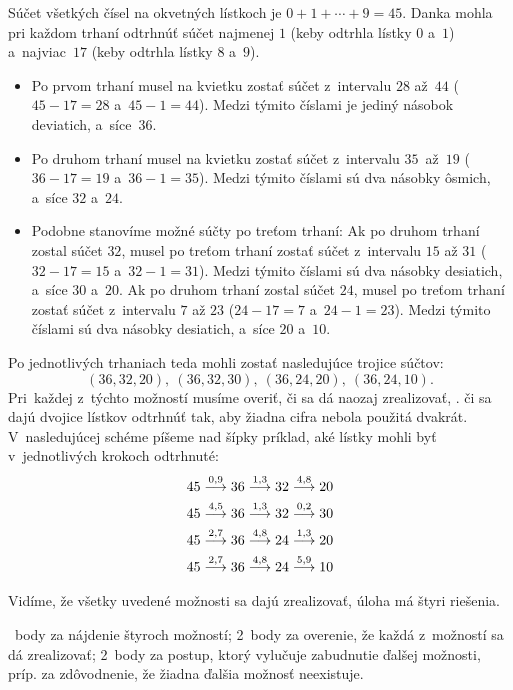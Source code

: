 {%
Súčet všetkých čísel na okvetných lístkoch je $0+1+\cdots+9=45$.
Danka mohla pri každom trhaní odtrhnúť súčet najmenej $1$ (keby odtrhla
lístky $0$ a~$1$) a~najviac~$17$ (keby odtrhla lístky $8$ a~$9$).
\begin{itemize}
\item Po prvom trhaní musel na kvietku zostať súčet z~intervalu $28$ až~$44$
($45-17=28$ a~$45-1=44$).
Medzi týmito číslami je jediný násobok deviatich, a~síce~$36$.
\item Po druhom trhaní musel na kvietku zostať súčet z~intervalu $35$~až~$19$
($36-17=19$ a~$36-1=35$). Medzi týmito číslami sú dva násobky ôsmich, a~síce
$32$ a~$24$.
\item Podobne stanovíme možné súčty po treťom trhaní:
\itemitem{--}
Ak po druhom trhaní zostal súčet $32$, musel po treťom trhaní zostať
súčet z~intervalu $15$ až $31$ ($32-17=15$ a~$32-1=31$).
Medzi týmito číslami sú dva násobky desiatich, a~síce $30$ a~$20$.
\itemitem{--}
Ak po druhom trhaní zostal súčet $24$, musel po treťom trhaní zostať
súčet z~intervalu $7$ až $23$ ($24-17=7$ a~$24-1=23$).
Medzi týmito číslami sú dva násobky desiatich, a~síce $20$ a~$10$.
\end{itemize}
\noindent
Po jednotlivých trhaniach teda mohli zostať nasledujúce trojice súčtov:
$$
(36,32,20),\ (36,32,30),\ (36,24,20),\ (36,24,10).
$$
Pri~každej z~týchto možností musíme overiť, či sa dá naozaj zrealizovať,
\tj. či sa dajú dvojice lístkov odtrhnúť tak, aby žiadna cifra nebola
použitá dvakrát.
V~nasledujúcej schéme píšeme nad šípky príklad, aké lístky mohli byť
v~jednotlivých krokoch odtrhnuté:
$$
\aligned
45\buildrel0,9\over\longrightarrow
36\buildrel1,3\over\longrightarrow
32\buildrel4,8\over\longrightarrow
20\\
45\buildrel4,5\over\longrightarrow
36\buildrel1,3\over\longrightarrow
32\buildrel0,2\over\longrightarrow
30\\
45\buildrel2,7\over\longrightarrow
36\buildrel4,8\over\longrightarrow
24\buildrel1,3\over\longrightarrow
20\\
45\buildrel2,7\over\longrightarrow
36\buildrel4,8\over\longrightarrow
24\buildrel5,9\over\longrightarrow
10
\endaligned
$$

Vidíme, že všetky uvedené možnosti sa dajú zrealizovať, úloha má štyri
riešenia.

~body za nájdenie štyroch možností;
2~body za overenie, že každá z~možností sa dá zrealizovať;
2~body za postup, ktorý vylučuje zabudnutie ďalšej možnosti,
príp. za zdôvodnenie, že žiadna ďalšia možnosť neexistuje.
\endhodnotenie
}

